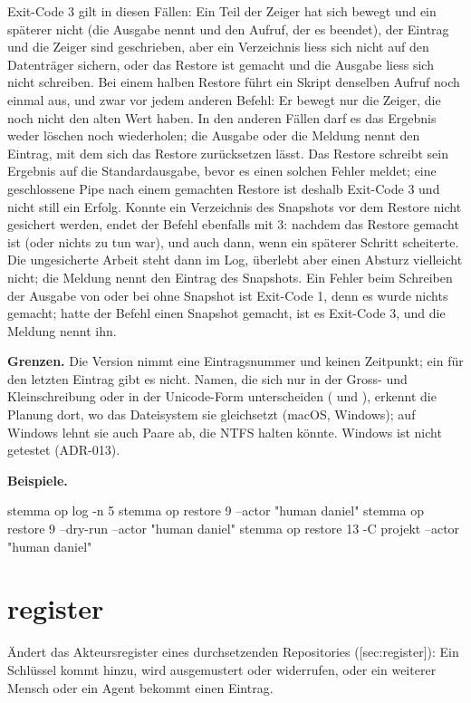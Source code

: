 Exit-Code 3 gilt in diesen Fällen:
Ein Teil der Zeiger hat sich bewegt und ein späterer nicht (die Ausgabe nennt
 und den Aufruf, der es beendet), der Eintrag und die Zeiger sind geschrieben,
aber ein Verzeichnis liess sich nicht auf den Datenträger sichern, oder das Restore ist gemacht
und die Ausgabe liess sich nicht schreiben.
Bei einem halben Restore führt ein Skript denselben Aufruf noch einmal aus,
und zwar vor jedem anderen Befehl: Er bewegt nur die Zeiger, die noch nicht den alten Wert haben.
In den anderen Fällen darf es das Ergebnis weder löschen noch wiederholen; die Ausgabe
oder die Meldung nennt den Eintrag, mit dem sich das Restore zurücksetzen lässt.
Das Restore schreibt sein Ergebnis auf die Standardausgabe, bevor es einen solchen
Fehler meldet; eine geschlossene Pipe nach einem gemachten Restore ist deshalb Exit-Code 3
und nicht still ein Erfolg.
Konnte ein Verzeichnis des Snapshots vor dem Restore nicht gesichert werden, endet der Befehl
ebenfalls mit 3: nachdem das Restore gemacht ist (oder nichts zu tun war), und auch dann, wenn
ein späterer Schritt scheiterte. Die ungesicherte Arbeit steht dann im Log, überlebt aber
einen Absturz vielleicht nicht; die Meldung nennt den Eintrag des Snapshots.
Ein Fehler beim Schreiben der Ausgabe von  oder bei
 ohne Snapshot ist Exit-Code 1, denn es wurde nichts gemacht;
hatte der Befehl einen Snapshot gemacht, ist es Exit-Code 3, und die Meldung nennt ihn.

{\bf Grenzen.} Die Version nimmt eine Eintragsnummer und keinen Zeitpunkt; ein
 für den letzten Eintrag gibt es nicht.
Namen, die sich nur in der Gross- und Kleinschreibung oder in der Unicode-Form
unterscheiden ( und ), erkennt die Planung dort, wo das Dateisystem
sie gleichsetzt (macOS, Windows); auf Windows lehnt sie auch Paare ab, die NTFS halten könnte.
Windows ist nicht getestet (ADR-013).

{\bf Beispiele.}

\starttyping
stemma op log -n 5
stemma op restore 9 --actor "human daniel"
stemma op restore 9 --dry-run --actor "human daniel"
stemma op restore 13 -C projekt --actor "human daniel"
\stoptyping

\section{register}

Ändert das Akteursregister eines durchsetzenden Repositories ([sec:register]):
Ein Schlüssel kommt hinzu, wird ausgemustert oder widerrufen, oder ein weiterer Mensch
oder ein Agent bekommt einen Eintrag.

